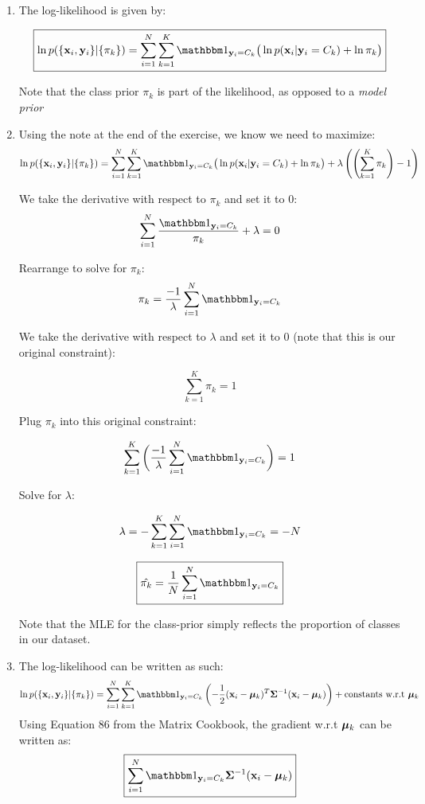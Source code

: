 \documentclass[submit]{harvardml}
\begin{document}
            
        \begin{enumerate}

            \item The log-likelihood is given by:

            $$\boxed{\ln p(\{\mathbf{x}_i, \mathbf{y}_i\} | \{\pi_k\})=
            \sum_{i=1}^N\sum_{k=1}^K \yickindicator\big(\ln p(\boldx_i | \boldy_i = C_k) + \ln\pi_k\big)}
            $$

            Note that the class prior $\pi_k$ is part of the likelihood, as opposed to a \textit{model prior}


            \item

            Using the note at the end of the exercise, we know we need to maximize:
            $$\ln p(\{\mathbf{x}_i, \mathbf{y}_i\} | \{\pi_k\})=
            \sum_{i=1}^N\sum_{k=1}^K \yickindicator\big(\ln p(\boldx_i | \boldy_i = C_k) + \ln\pi_k\big)
            + \lambda \left(
            \left(\sum_{k=1}^K \pi_k\right) - 1\right)$$


            We take the derivative with respect to $\pi_k$ and set it to $0$:
            $$\sum_{i=1}^N \frac{\yickindicator}{\pi_{k}} + \lambda = 0$$

            Rearrange to solve for $\pi_{k}$:
            $$ \pi_{k} = \frac{-1}{\lambda} \sum_{i=1}^N \yickindicator$$

            We take the derivative with respect to $\lambda$ and set it to 0 (note that this is our original constraint):

            $$\sum_{k=1}^K \pi_k = 1$$

            Plug $\pi_{k}$ into this original constraint:

            $$\sum_{k=1}^K \bigg( \frac{-1}{\lambda} \sum_{i=1}^N \yickindicator \bigg) = 1$$

            Solve for $\lambda$:

            $$\lambda = -\sum_{k=1}^K \sum_{i=1}^N \yickindicator = -N$$

            $$\boxed{\hat{\pi_k} = \frac{1}{N}\sum_{i=1}^N\yickindicator}$$



            Note that the MLE for the class-prior simply reflects the proportion of classes in our dataset.

            \item

            The log-likelihood can be written as such:
            $$\ln p(\{\mathbf{x}_i, \mathbf{y}_i\} | \{\pi_k\})= \sum_{i=1}^N \sum_{k=1}^K \yickindicator
            \left(-\frac{1}{2}(\mathbf{x}_i - \bmu_k)^T\bSigma^{-1} (\mathbf{x}_i - \bmu_k)\right) +
            \text{constants w.r.t $\bmu_k$}$$
            Using Equation 86 from the Matrix Cookbook, the gradient w.r.t $\boldsymbol{\mu}_k$ can be written as:
            $$\boxed{\sum_{i=1}^N \yickindicator \bSigma^{-1} (\mathbf{x}_i - \bmu_k)}$$


\end{enumerate}
\end{document}
